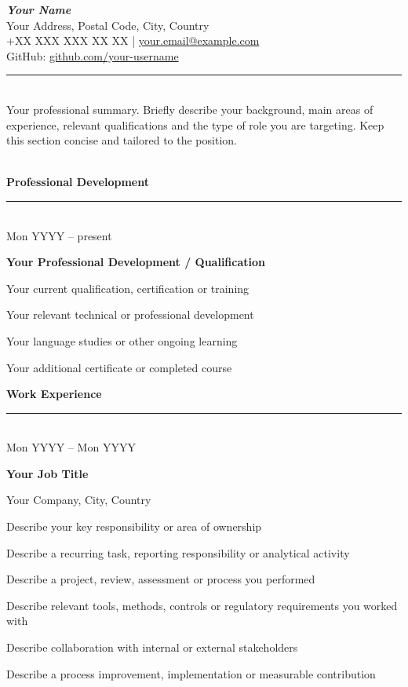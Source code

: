 \documentclass[11pt,a4paper]{article}
\newcommand{\cvsection}[1]{%
  \vspace{0pt}%
  {\large\bfseries\color{SoftBlue} #1}\\[-2ex]%
  {\color{SoftBlue}\rule{\linewidth}{0.4pt}}\\[0.2ex]%
}
\newcommand{\summaryblock}[1]{%
  {\color{SoftBlue}\rule{\linewidth}{0.4pt}}\\[2pt]%
  {\small #1}\par 
  \vspace{1pt}{\color{SoftBlue}\rule{\linewidth}{0.4pt}}\\[2pt]%
}
\newcommand{\entry}[4]{%
  \noindent
  {\small\color{SoftBlue}#1}\par
  \textbf{#2}\par
  {#3}\par

  \vspace{-2pt}
  \begin{list}{\textcolor{black!80}{\large\textbullet}}{%
    \setlength{\leftmargin}{1.5em}
    \setlength{\labelsep}{0.6em}
    \setlength{\itemsep}{0.5pt}
    \setlength{\parsep}{0pt}
  }
    #4
  \end{list}
  \vspace{6pt}
}
\begin{document}
\pagestyle{empty}

\begin{center}
  {\LARGE\bfseries\itshape\color{SoftBlue} Your Name}\\[3pt]
  Your Address, Postal Code, City, Country\\
  +XX XXX XXX XX XX \;|\; \href{mailto:your.email@example.com}{your.email@example.com}\\
  GitHub: \href{https://github.com/your-username}{github.com/your-username}
\end{center}
\vspace{0.005pt}

\summaryblock{%
Your professional summary. Briefly describe your background, main areas of experience, relevant qualifications and the type of role you are targeting. Keep this section concise and tailored to the position.
}

\cvsection{Professional Development}
\entry
{Mon YYYY -- present}
{Your Professional Development / Qualification}
{}
{\vspace{-5pt}
\item Your current qualification, certification or training
\item Your relevant technical or professional development
\item Your language studies or other ongoing learning
\item Your additional certificate or completed course
}
\vspace{-5pt}

\cvsection{Work Experience}
\entry
{Mon YYYY -- Mon YYYY}
{Your Job Title}
{Your Company, City, Country}
{\vspace{-5pt}
\item Describe your key responsibility or area of ownership
\item Describe a recurring task, reporting responsibility or analytical activity
\item Describe a project, review, assessment or process you performed
\item Describe relevant tools, methods, controls or regulatory requirements you worked with
\item Describe collaboration with internal or external stakeholders
\item Describe a process improvement, implementation or measurable contribution
}
\vspace{-10pt}
\end{document}
